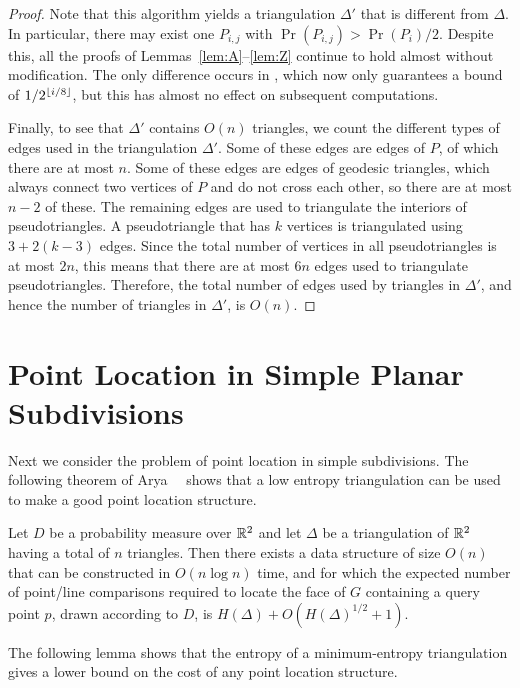 \documentclass[lotsofwhite]{patmorin}
\begin{document}
\begin{proof}
Note that this algorithm yields a triangulation $\Delta'$ that is
different from $\Delta$.  In particular, there may exist one $P_{i,j}$
with $\Pr(P_{i,j})>\Pr(P_i)/2$.  Despite this, all the proofs of
Lemmas~\ref{lem:A}--\ref{lem:Z} continue to hold almost without modification.
The only difference occurs in , which now only
guarantees a bound of $1/2^{\left\lfloor i/8 \right\rfloor}$, 
but this has almost no effect on subsequent computations.

Finally, to see that $\Delta'$ contains $O(n)$
triangles, we count the different types of edges used in the
triangulation $\Delta'$.  Some of these edges are edges of $P$, of
which there are at most $n$.  Some of these edges are edges of
geodesic triangles,
which always connect two vertices of $P$ and do not cross each other,
so there are at most $n-2$ of these.  The remaining edges are used to
triangulate the interiors of pseudotriangles.  A pseudotriangle that has $k$ vertices
is triangulated using $3 + 2(k-3)$ edges.  Since the total number of
vertices in all pseudotriangles is at most $2n$, this means that there are at
most $6n$ edges used to triangulate pseudotriangles.  Therefore, the total
number of edges used by triangles in $\Delta'$, and hence the number
of triangles in $\Delta'$, is $O(n)$.  
\end{proof}

\section{Point Location in Simple Planar Subdivisions}

Next we consider the problem of point location in simple
subdivisions.  The following theorem of Arya~\etal~\cite{ammw07}
shows that a low entropy triangulation can be used to make a good
point location structure.

\begin{thm}
Let $D$ be a probability measure over $\mathbb{R}^2$ and let $\Delta$ be a
triangulation of $\mathbb{R}^2$ having a total of $n$ triangles.  Then there exists a
data structure of size $O(n)$ that can be constructed in $O(n\log n)$
time, and for which the expected number of point/line comparisons
required to locate the face of $G$ containing a query point $p$, drawn
according to $D$, is $H(\Delta) + O(H(\Delta)^{1/2}+1)$.
\end{thm}

The following lemma shows that the entropy of a minimum-entropy
triangulation gives a lower bound on the cost of any point location
structure.
\end{document}
